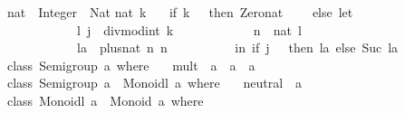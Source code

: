 \begin{isabellebody}
\begin{isamarkuptext}
\isanewline
nat\ {}{}\ Integer\ {}{}\ Nat{}\isanewline
nat\ k\ {}\isanewline
\ \ {}if\ k\ {}{}\ {}\ then\ Zero{}nat\isanewline
\ \ \ \ else\ let\ {}\isanewline
\ \ \ \ \ \ \ \ \ \ \ {}l{}\ j{}\ {}\ divmod{}int\ k\ {}{}\isanewline
\ \ \ \ \ \ \ \ \ \ \ n\ {}\ nat\ l{}\isanewline
\ \ \ \ \ \ \ \ \ \ \ la\ {}\ plus{}nat\ n\ n{}\isanewline
\ \ \ \ \ \ \ \ \ {}\ in\ {}if\ j\ {}{}\ {}\ then\ la\ else\ Suc\ la{}{}{}\isanewline
\isanewline
class\ Semigroup\ a\ where\ {}\isanewline
\ \ mult\ {}{}\ a\ {}{}\ a\ {}{}\ a{}\isanewline
{}{}\isanewline
\isanewline
class\ {}Semigroup\ a{}\ {}{}\ Monoidl\ a\ where\ {}\isanewline
\ \ neutral\ {}{}\ a{}\isanewline
{}{}\isanewline
\isanewline
class\ {}Monoidl\ a{}\ {}{}\ Monoid\ a\ where\ {}\isanewline
{}{}\isanewline

\end{isamarkuptext}
\end{isabellebody}

